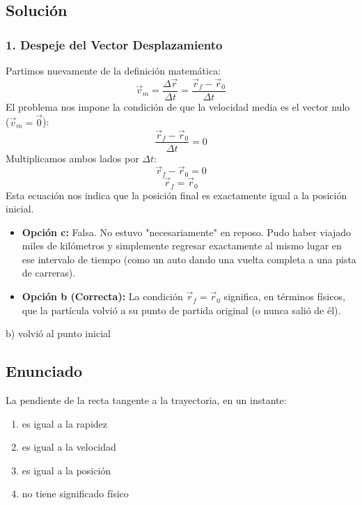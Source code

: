 \documentclass[12pt, a4paper]{article}
\begin{document}
\subsection*{Solución}

\subsubsection*{1. Despeje del Vector Desplazamiento}
Partimos nuevamente de la definición matemática:
$$ \vec{v}_m = \frac{\Delta \vec{r}}{\Delta t} = \frac{\vec{r}_f - \vec{r}_0}{\Delta t} $$
El problema nos impone la condición de que la velocidad media es el vector nulo ($\vec{v}_m = \vec{0}$):
$$ \frac{\vec{r}_f - \vec{r}_0}{\Delta t} = 0 $$
Multiplicamos ambos lados por $\Delta t$:
$$ \vec{r}_f - \vec{r}_0 = 0 $$
$$ \vec{r}_f = \vec{r}_0 $$
Esta ecuación nos indica que la posición final es exactamente igual a la posición inicial. 
\begin{itemize}
    \item \textbf{Opción c:} Falsa. No estuvo "necesariamente" en reposo. Pudo haber viajado miles de kilómetros y simplemente regresar exactamente al mismo lugar en ese intervalo de tiempo (como un auto dando una vuelta completa a una pista de carreras).
    \item \textbf{Opción b (Correcta):} La condición $\vec{r}_f = \vec{r}_0$ significa, en términos físicos, que la partícula volvió a su punto de partida original (o nunca salió de él).
\end{itemize}

\begin{tcolorbox}[colback=green!5!white, colframe=green!50!black, title=Respuesta Final]
\centering \Large b) volvió al punto inicial
\end{tcolorbox}

\newpage


\subsection*{Enunciado}
La pendiente de la recta tangente a la trayectoria, en un instante:
\begin{enumerate}[label=\alph*)]
    \item es igual a la rapidez
    \item es igual a la velocidad
    \item es igual a la posición
    \item no tiene significado físico
\end{enumerate}
\end{document}
